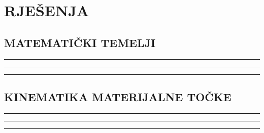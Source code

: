\documentclass[10pt]{book}
\newcounter{zadatak} %
\newcounter{cjelina}
\begin{document}
\chapter{RJEŠENJA}
\section{MATEMATIČKI TEMELJI}


{\color{boja} \rule{\linewidth}{0.3mm} }



{\color{boja} \rule{\linewidth}{0.3mm} }




{\color{boja} \rule{\linewidth}{0.3mm} }


\setcounter{zadatak}{0}

\section{KINEMATIKA MATERIJALNE TOČKE}

{\color{boja} \rule{\linewidth}{0.3mm} }


{\color{boja} \rule{\linewidth}{0.3mm} }


{\color{boja} \rule{\linewidth}{0.3mm} }



\setcounter{zadatak}{0}






%

%

\end{document}
